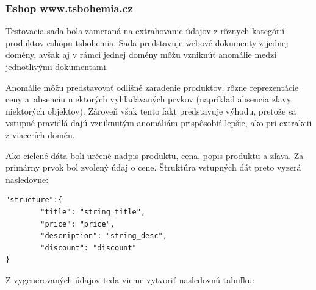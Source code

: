 \newpage

\subsubsection{Eshop www.tsbohemia.cz}

Testovacia sada bola zameraná na extrahovanie údajov z rôznych kategórií produktov eshopu tsbohemia. Sada predstavuje webové dokumenty z jednej domény, avšak aj v rámci jednej domény môžu vzniknúť anomálie medzi jednotlivými dokumentami.

Anomálie môžu predstavovať odlišné zaradenie produktov, rôzne reprezentácie ceny a~absenciu niektorých vyhľadávaných prvkov (napríklad absencia zľavy niektorých objektov). Zároveň však tento fakt predstavuje výhodu, pretože sa vstupné pravidlá dajú vzniknutým anomáliám prispôsobiť lepšie, ako pri extrakcii z viacerích domén.

\bigskip

Ako cielené dáta boli určené nadpis produktu, cena, popis produktu a zľava. Za primárny prvok bol zvolený údaj o cene. Štruktúra vstupných dát preto vyzerá nasledovne:

\bigskip

\begin{lstlisting}
"structure":{
        "title": "string_title",
        "price": "price",
        "description": "string_desc",
        "discount": "discount"
}
\end{lstlisting}

\bigskip

Z vygenerovaných údajov teda vieme vytvoriť nasledovnú tabuľku:


